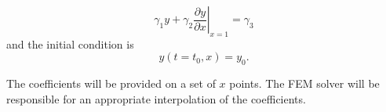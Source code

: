 \begin{equation}
{\left. {{\gamma _1}y + {\gamma _2}\frac{{\partial y}}{{\partial x}}} \right|_{x = 1}} = {\gamma _3}
\end{equation}
and the initial condition is
\begin{equation}
y\left( {t = {t_0},x} \right) = {y_0}.
\end{equation}

The coefficients will be provided on a set of $x$ points.
The FEM solver will be responsible for an appropriate interpolation
of the coefficients.

